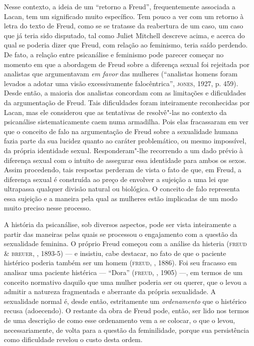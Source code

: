 Nesse contexto, a ideia de um ``retorno a Freud'', frequentemente
associada a Lacan, tem um significado muito específico. Tem pouco a ver
com um retorno à letra do texto de Freud, como se se tratasse da
reabertura de um caso, um caso que já teria sido disputado, tal como
Juliet Mitchell descreve acima, e acerca do qual se poderia dizer que
Freud, com relação ao feminismo, teria saído perdendo. De fato, a
relação entre psicanálise e feminismo pode parecer começar no momento em
que a abordagem de Freud sobre a diferença sexual foi rejeitada por
analistas que argumentavam \emph{em favor} das mulheres (``analistas
homens foram levados a adotar uma visão excessivamente falocêntrica'',
\textsc{jones}, 1927, p. 459). Desde então, a maioria dos analistas concordam com
as limitações e dificuldades da argumentação de Freud. Tais dificuldades
foram inteiramente reconhecidas por Lacan, mas ele considerou que as
tentativas de resolvê"-las no contexto da psicanálise sistematicamente
caem numa armadilha. Pois elas fracassaram em ver que o conceito de falo
na argumentação de Freud sobre a sexualidade humana fazia parte da sua
lucidez quanto ao caráter problemático, ou mesmo impossível, da própria
identidade sexual. Responderam"-lhe recorrendo a um dado prévio à
diferença sexual com o intuito de assegurar essa identidade para ambos
os sexos. Assim procedendo, tais respostas perderam de vista o fato de
que, em Freud, a diferença sexual é construída ao preço de envolver a
sujeição a uma lei que ultrapassa qualquer divisão natural ou biológica.
O conceito de falo representa essa sujeição e a maneira pela qual as
mulheres estão implicadas de um modo muito preciso nesse processo.

A história da psicanálise, sob diversos aspectos, pode ser vista
inteiramente a partir das maneiras pelas quais se processou o
engajamento com a questão da sexualidade feminina. O próprio Freud
começou com a análise da histeria (\textsc{freud} \& \textsc{breuer}, , 1893-5) --- e
insistiu, cabe destacar, no fato de que o paciente histérico poderia
também ser um homem (\textsc{freud}, , 1886). Foi seu fracasso em analisar uma
paciente histérica --- ``Dora'' (\textsc{freud}, , 1905) ---, em termos de um
conceito normativo daquilo que uma mulher poderia ser ou querer, que o
levou a admitir a natureza fragmentada e aberrante da própria
sexualidade. A sexualidade normal é, desde então, estritamente um
\emph{ordenamento} que o histérico recusa (adoecendo). O restante da
obra de Freud pode, então, ser lido nos termos de uma descrição de como
esse ordenamento vem a se colocar, o que o levou, necessariamente, de
volta para a questão da feminilidade, porque sua persistência como
dificuldade revelou o custo desta ordem.

